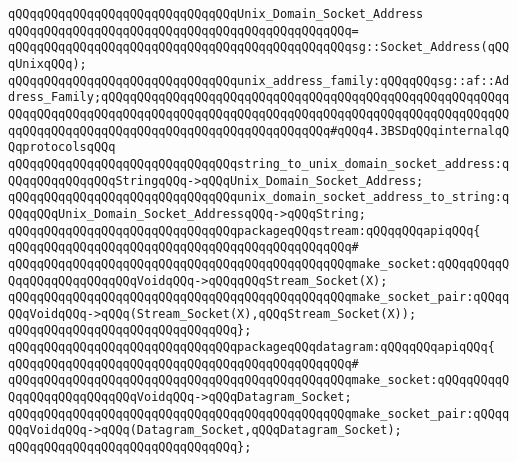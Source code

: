 \newline
\verb|qQQqqQQqqQQqqQQqqQQqqQQqqQQqqQQqUnix_Domain_Socket_Address|\newline
\verb|qQQqqQQqqQQqqQQqqQQqqQQqqQQqqQQqqQQqqQQqqQQqqQQq=|\newline
\verb|qQQqqQQqqQQqqQQqqQQqqQQqqQQqqQQqqQQqqQQqqQQqqQQqsg::Socket_Address(qQQqUnixqQQq);|\newline
\newline
\verb|qQQqqQQqqQQqqQQqqQQqqQQqqQQqqQQqunix_address_family:qQQqqQQqsg::af::Address_Family;qQQqqQQqqQQqqQQqqQQqqQQqqQQqqQQqqQQqqQQqqQQqqQQqqQQqqQQqqQQqqQQqqQQqqQQqqQQqqQQqqQQqqQQqqQQqqQQqqQQqqQQqqQQqqQQqqQQqqQQqqQQqqQQqqQQqqQQqqQQqqQQqqQQqqQQqqQQqqQQqqQQqqQQqqQQq#qQQq4.3BSDqQQqinternalqQQqprotocolsqQQq|\newline
\newline
\verb|qQQqqQQqqQQqqQQqqQQqqQQqqQQqqQQqstring_to_unix_domain_socket_address:qQQqqQQqqQQqqQQqStringqQQq->qQQqUnix_Domain_Socket_Address;|\newline
\verb|qQQqqQQqqQQqqQQqqQQqqQQqqQQqqQQqunix_domain_socket_address_to_string:qQQqqQQqUnix_Domain_Socket_AddressqQQq->qQQqString;|\newline
\newline
\verb|qQQqqQQqqQQqqQQqqQQqqQQqqQQqqQQqpackageqQQqstream:qQQqqQQqapiqQQq{|\newline
\verb|qQQqqQQqqQQqqQQqqQQqqQQqqQQqqQQqqQQqqQQqqQQqqQQq#|\newline
\verb|qQQqqQQqqQQqqQQqqQQqqQQqqQQqqQQqqQQqqQQqqQQqqQQqmake_socket:qQQqqQQqqQQqqQQqqQQqqQQqqQQqVoidqQQq->qQQqqQQqStream_Socket(X);|\newline
\verb|qQQqqQQqqQQqqQQqqQQqqQQqqQQqqQQqqQQqqQQqqQQqqQQqmake_socket_pair:qQQqqQQqVoidqQQq->qQQq(Stream_Socket(X),qQQqStream_Socket(X));|\newline
\verb|qQQqqQQqqQQqqQQqqQQqqQQqqQQqqQQq};|\newline
\newline
\verb|qQQqqQQqqQQqqQQqqQQqqQQqqQQqqQQqpackageqQQqdatagram:qQQqqQQqapiqQQq{|\newline
\verb|qQQqqQQqqQQqqQQqqQQqqQQqqQQqqQQqqQQqqQQqqQQqqQQq#|\newline
\verb|qQQqqQQqqQQqqQQqqQQqqQQqqQQqqQQqqQQqqQQqqQQqqQQqmake_socket:qQQqqQQqqQQqqQQqqQQqqQQqqQQqVoidqQQq->qQQqDatagram_Socket;|\newline
\verb|qQQqqQQqqQQqqQQqqQQqqQQqqQQqqQQqqQQqqQQqqQQqqQQqmake_socket_pair:qQQqqQQqVoidqQQq->qQQq(Datagram_Socket,qQQqDatagram_Socket);|\newline
\verb|qQQqqQQqqQQqqQQqqQQqqQQqqQQqqQQq};|\newline
